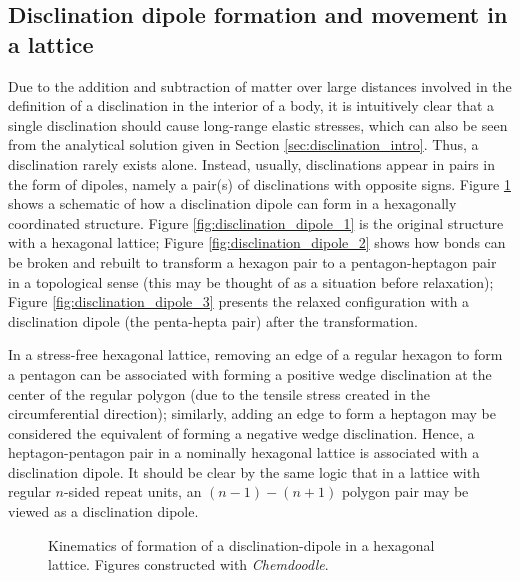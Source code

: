 \documentclass[11pt,letterpaper]{article}
\begin{document}
\subsection{Disclination dipole formation and movement in a lattice}

Due to the addition and subtraction of matter over large distances involved in the definition of a disclination in the interior of a body, it is intuitively clear that a single disclination should cause long-range elastic stresses, which can also be seen from the analytical solution given in Section \ref{sec:disclination_intro}. Thus, a disclination rarely exists alone. Instead, usually, disclinations appear in pairs in the form of dipoles, namely a pair(s) of disclinations with opposite signs. Figure \ref{fig:disclination_dipole} shows a schematic of how a disclination dipole can form in a hexagonally coordinated structure. Figure \ref{fig:disclination_dipole_1} is the original structure with a hexagonal lattice; Figure \ref{fig:disclination_dipole_2} shows how bonds can be broken and rebuilt to transform a hexagon pair to a pentagon-heptagon pair in a topological sense (this may be thought of as a situation before relaxation); Figure \ref{fig:disclination_dipole_3} presents the relaxed configuration with a disclination dipole (the penta-hepta pair) after the transformation. 

In a stress-free hexagonal lattice, removing an edge of a regular hexagon to form a pentagon can be associated with forming a positive wedge disclination at the center of the regular polygon (due to the tensile stress created in the circumferential direction); similarly, adding an edge to form a heptagon may be considered the equivalent of forming a negative wedge disclination. Hence, a heptagon-pentagon pair in a nominally hexagonal lattice is associated with a disclination dipole. It should be clear by the same logic that in a lattice with regular $n$-sided repeat units, an $(n-1)-(n+1)$ polygon pair may be viewed as a disclination dipole.

\begin{figure}
\centering
{}\qquad
{}
\caption{Kinematics of formation of a disclination-dipole in a hexagonal lattice. Figures constructed with \textit{Chemdoodle}\cite{chem}.}
\label{fig:disclination_dipole}
\end {figure}
\end{document}
